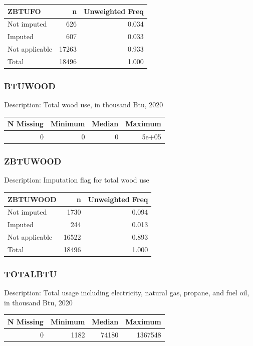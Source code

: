 \documentclass[
]{krantz}
\begin{document}
\begin{tabular}[t]{l|r|r}
\hline
ZBTUFO & n & Unweighted Freq\\
\hline
Not imputed & 626 & 0.034\\
\hline
Imputed & 607 & 0.033\\
\hline
Not applicable & 17263 & 0.933\\
\hline
Total & 18496 & 1.000\\
\hline
\end{tabular}

\hypertarget{btuwood}{%
\subsubsection*{BTUWOOD}\label{btuwood}}


Description: Total wood use, in thousand Btu, 2020

\begin{tabular}[t]{r|r|r|r}
\hline
N Missing & Minimum & Median & Maximum\\
\hline
0 & 0 & 0 & 5e+05\\
\hline
\end{tabular}

\hypertarget{zbtuwood}{%
\subsubsection*{ZBTUWOOD}\label{zbtuwood}}


Description: Imputation flag for total wood use

\begin{tabular}[t]{l|r|r}
\hline
ZBTUWOOD & n & Unweighted Freq\\
\hline
Not imputed & 1730 & 0.094\\
\hline
Imputed & 244 & 0.013\\
\hline
Not applicable & 16522 & 0.893\\
\hline
Total & 18496 & 1.000\\
\hline
\end{tabular}

\hypertarget{totalbtu}{%
\subsubsection*{TOTALBTU}\label{totalbtu}}


Description: Total usage including electricity, natural gas, propane, and fuel oil, in thousand Btu, 2020

\begin{tabular}[t]{r|r|r|r}
\hline
N Missing & Minimum & Median & Maximum\\
\hline
0 & 1182 & 74180 & 1367548\\
\hline
\end{tabular}
\end{document}
